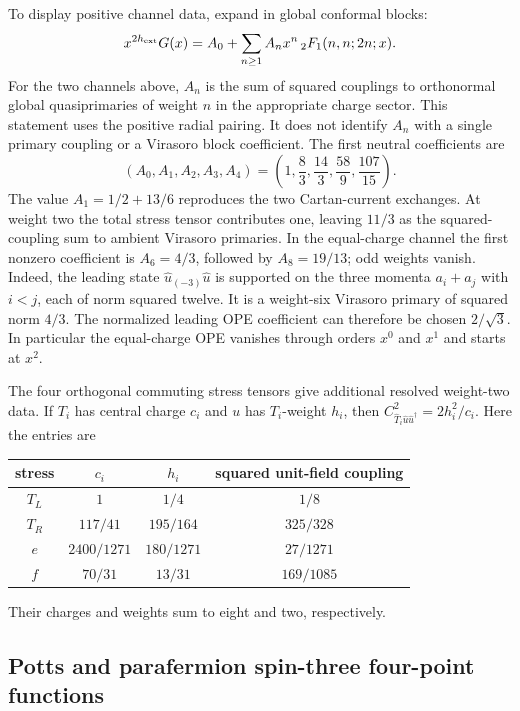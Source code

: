\documentclass[11pt,a4paper]{article}
\theoremstyle{definition}
\begin{document}
To display positive channel data, expand in global conformal blocks:
\begin{equation}
 x^{2h_{\rm ext}}G(x)=A_0+
       \sum_{n\ge1}A_n x^n\,{}_2F_1(n,n;2n;x).
 \label{eq:physics-global-block-convention}
\end{equation}
For the two channels above, $A_n$ is the sum of squared couplings to
orthonormal global quasiprimaries of weight $n$ in the appropriate charge
sector.  This statement uses the positive radial pairing.  It does not
identify $A_n$ with a single primary coupling or a Virasoro block
coefficient.  The first neutral coefficients are
\begin{equation}
 (A_0,A_1,A_2,A_3,A_4)
 =\left(1,\frac83,\frac{14}3,\frac{58}9,\frac{107}{15}\right).
\end{equation}
The value $A_1=1/2+13/6$ reproduces the two Cartan-current exchanges.
At weight two the total stress tensor contributes one, leaving
$11/3$ as the squared-coupling sum to ambient Virasoro primaries.
In the equal-charge channel the first nonzero coefficient is
$A_6=4/3$, followed by $A_8=19/13$; odd weights vanish.  Indeed,
the leading state $\widehat u_{(-3)}\widehat u$ is supported on the
three momenta $a_i+a_j$ with $i<j$, each of norm squared twelve.
It is a weight-six Virasoro primary of squared norm $4/3$.
The normalized leading OPE coefficient can therefore be chosen
$2/\sqrt3$.  In particular the equal-charge OPE vanishes through
orders $x^0$ and $x^1$ and starts at $x^2$.

The four orthogonal commuting stress tensors give additional resolved
weight-two data.  If $T_i$ has central charge $c_i$ and $u$ has
$T_i$-weight $h_i$, then
$C_{\widehat T_i\widehat u\widehat u^\dagger}^2=2h_i^2/c_i$.
Here the entries are
\begin{center}
\begin{tabular}{c|c|c|c}
stress & $c_i$ & $h_i$ & squared unit-field coupling\\\hline
$T_L$ & $1$ & $1/4$ & $1/8$\\
$T_R$ & $117/41$ & $195/164$ & $325/328$\\
$e$ & $2400/1271$ & $180/1271$ & $27/1271$\\
$f$ & $70/31$ & $13/31$ & $169/1085$
\end{tabular}
\end{center}
Their charges and weights sum to eight and two, respectively.

\subsection{Potts and parafermion spin-three four-point functions}
\end{document}
